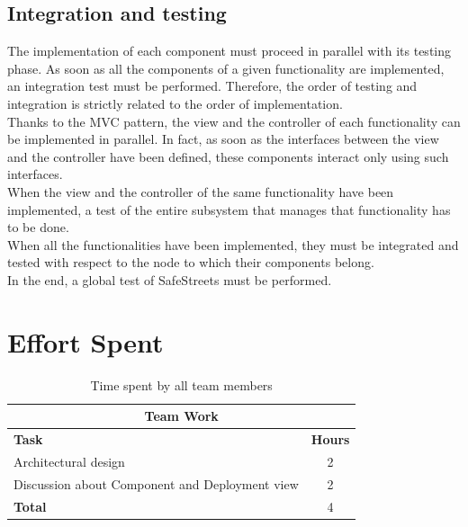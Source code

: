 \documentclass{article}
\begin{document}
		\subsection{Integration and testing}
			The implementation of each component must proceed in parallel with its testing phase. As soon as all the components of a given functionality are implemented, an integration test must be performed. Therefore, the order of testing and integration is strictly related to the order of implementation.\\
			Thanks to the MVC pattern, the view and the controller of each functionality can be implemented in parallel. In fact, as soon as the interfaces between the view and the controller have been defined, these components interact only using such interfaces.\\
			When the view and the controller of the same functionality have been implemented, a test of the entire subsystem that manages that functionality has to be done.\\
			When all the functionalities have been implemented, they must be integrated and tested with respect to the node to which their components belong.\\
			In the end, a global test of SafeStreets must be performed.\\
	
	\clearpage
	\section{Effort Spent}
		\begin{table}[h]
			\centering
			\begin{tabular}{l c}
				\hline\hline
				\multicolumn{2}{c}{\textbf{Team Work}} \\
				\hline
				\textbf{Task} & \textbf{Hours} \\ [0.5ex]
				\hline
				Architectural design & 2  \\
				Discussion about Component and Deployment view & 2 \\
				\hline
				\textbf{Total} & 4  \\
				\hline
			\end{tabular}
			\caption{Time spent by all team members}
			\label{fig:Time spent by all team members}
		\end{table}
		
\end{document}

